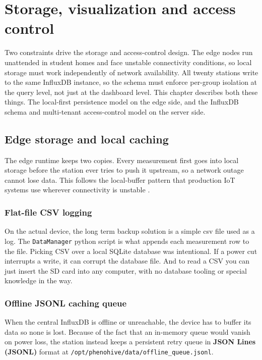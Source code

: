 ﻿\chapter{Storage, visualization and access control}
\label{ch:storage}

Two constraints drive the storage and access-control design. The edge nodes run unattended in student homes and face unstable connectivity conditions, so local storage must work independently of network availability. All twenty stations write to the same InfluxDB instance, so the schema must enforce per-group isolation at the query level, not just at the dashboard level. This chapter describes both these things. The local-first persistence model on the edge side, and the InfluxDB schema and multi-tenant access-control model on the server side.

\section{Edge storage and local caching}

The edge runtime keeps two copies. Every measurement first goes into local storage before the station ever tries to push it upstream, so a network outage cannot lose data. This follows the local-buffer pattern that production IoT systems use wherever connectivity is unstable \parencite{ruralegehealth2026}.

\subsection{Flat-file CSV logging}

On the actual device, the long term backup solution is a simple csv file used as a log. The \texttt{DataManager} python script is what appends each measurement row to the file. Picking CSV over a local SQLite database was intentional. If a power cut interrupts a write, it can corrupt the database file. And to read a CSV you can just insert the SD card into any computer, with no database tooling or special knowledge in the way.

\subsection{Offline JSONL caching queue}

When the central InfluxDB is offline or unreachable, the device has to buffer its data so none is lost. Because of the fact that an in-memory queue would vanish on power loss, the station instead keeps a persistent retry queue in \textbf{JSON Lines (JSONL)} format at \texttt{/opt/phenohive/data/offline\_queue.jsonl}.

